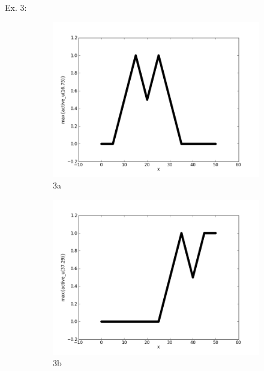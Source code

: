 \documentclass{report}
\begin{document}
Ex. 3:
\begin{figure}[ht]
        \begin{subfigure}[b]{0.5\textwidth}
                \centering
                \includegraphics[width=\textwidth]{ex3a.png}
                \caption{3a}
        \end{subfigure}
	\begin{subfigure}[b]{0.5\textwidth}
                \centering
                \includegraphics[width=\textwidth]{ex3b.png}
                \caption{3b}
	\end{subfigure}
	\begin{subfigure}[b]{0.5\textwidth}
                \centering

\end{subfigure}
\end{figure}
\end{document}
